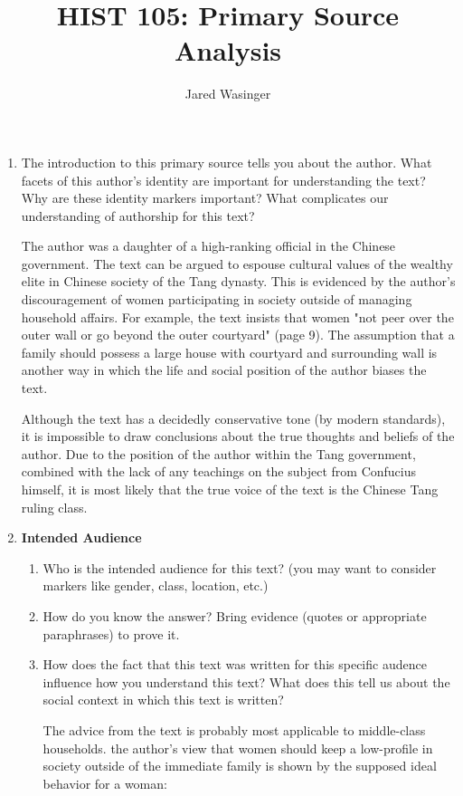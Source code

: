 \documentclass{article}
\begin{document}
  \title{ HIST 105: Primary Source Analysis}
  \author{Jared Wasinger}
  
  \begin{enumerate}
    \item The introduction to this primary source tells you about the author.  What facets of this author's identity are important for understanding the text? Why are these identity markers important? What complicates our understanding of authorship for this text?
      
      The author was a daughter of a high-ranking official in the Chinese government.  The text can be argued to espouse cultural values of the wealthy elite in Chinese society of the Tang dynasty.  This is evidenced by the author's discouragement of women participating in society outside of managing household affairs.  For example, the text insists that women "not peer over the outer wall or go beyond the outer courtyard" (page 9).  The assumption that a family should possess a large house with courtyard and surrounding wall is another way in which the life and social position of the author biases the text.

      Although the text has a decidedly conservative tone (by modern standards), it is impossible to draw conclusions about the true thoughts and beliefs of the author.  Due to the position of the author within the Tang government, combined with the lack of any teachings on the subject from Confucius himself, it is most likely that the true voice of the text is the Chinese Tang ruling class.
      

    \item \textbf{Intended Audience}
      \begin{enumerate}
      \item Who is the intended audience for this text? (you may want to consider markers like gender, class, location, etc.)



      \item How do you know the answer? Bring evidence (quotes or appropriate paraphrases) to prove it.
      \item How does the fact that this text was written for this specific audence influence how you understand this text? What does this tell us about the social context in which this text is written?

        The advice from the text is probably most applicable to middle-class households.  the author's view that women should keep a low-profile in society outside of the immediate family is shown by the supposed ideal behavior for a woman:


\end{enumerate}
\end{enumerate}
\end{document}
